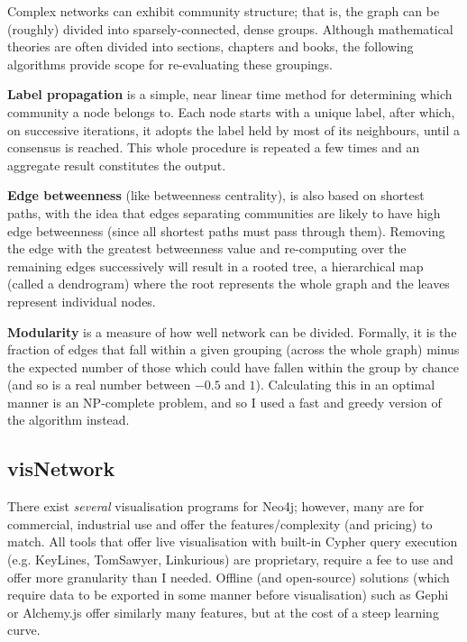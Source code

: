 Complex networks can exhibit community structure; that is, the graph can be
(roughly) divided into sparsely-connected, dense groups. Although mathematical
theories are often divided into sections, chapters and books, the following
algorithms provide scope for re-evaluating these groupings.

\textbf{Label propagation} is a simple, near linear time method for
determining which community a node belongs to. Each node starts with a unique
label, after which, on successive iterations, it adopts the label held by most
of its neighbours, until a consensus is reached. This whole procedure is
repeated a few times and an aggregate result constitutes the
output.~\cite{raghavan2007}

\textbf{Edge betweenness} (like betweenness centrality), is also based on
shortest paths, with the idea that edges separating communities are likely to
have high edge betweenness (since all shortest paths must pass through them).
Removing the edge with the greatest betweenness value and re-computing over the
remaining edges successively will result in a rooted tree, a hierarchical map
(called a dendrogram) where the root represents the whole graph and the leaves
represent individual nodes.~\cite{newman2004}

\textbf{Modularity} is a measure of how well network can be divided.  Formally,
it is the fraction of edges that fall within a given grouping (across the whole
graph) minus the expected number of those which could have fallen within the
group by chance (and so is a real number between $-0.5$ and $1$). Calculating
this in an optimal manner is an NP-complete problem, and so I used a fast and
greedy version of the algorithm instead.~\cite{clauset2004}

\subsection{visNetwork}

There exist \emph{several} visualisation programs for Neo4j; however, many are
for commercial, industrial use and offer the features/complexity (and pricing)
to match. All tools that offer live visualisation with built-in Cypher query
execution (e.g. KeyLines, TomSawyer, Linkurious) are proprietary, require a fee
to use and offer more granularity than I needed. Offline (and open-source)
solutions (which require data to be exported in some manner before
visualisation) such as Gephi or Alchemy.js offer similarly many features, but at
the cost of a steep learning curve. 

